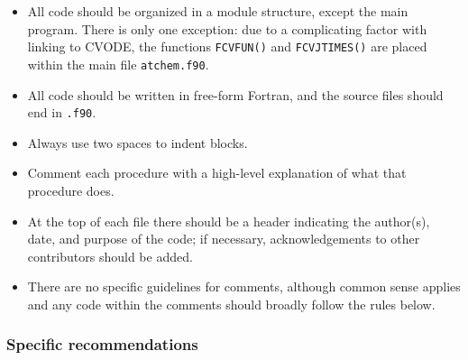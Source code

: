 \begin{itemize}
\item All code should be organized in a module structure, except the
  main program. There is only one exception: due to a complicating
  factor with linking to CVODE, the functions \texttt{FCVFUN()} and
  \texttt{FCVJTIMES()} are placed within the main file
  \texttt{atchem.f90}.
\item All code should be written in free-form Fortran, and the source
  files should end in \texttt{.f90}.
\item Always use two spaces to indent blocks.
\item Comment each procedure with a high-level explanation of what
  that procedure does.
\item At the top of each file there should be a header indicating the
  author(s), date, and purpose of the code; if necessary,
  acknowledgements to other contributors should be added.
\item There are no specific guidelines for comments, although common
  sense applies and any code within the comments should broadly follow
  the rules below.
\end{itemize}

\subsubsection{Specific recommendations}

